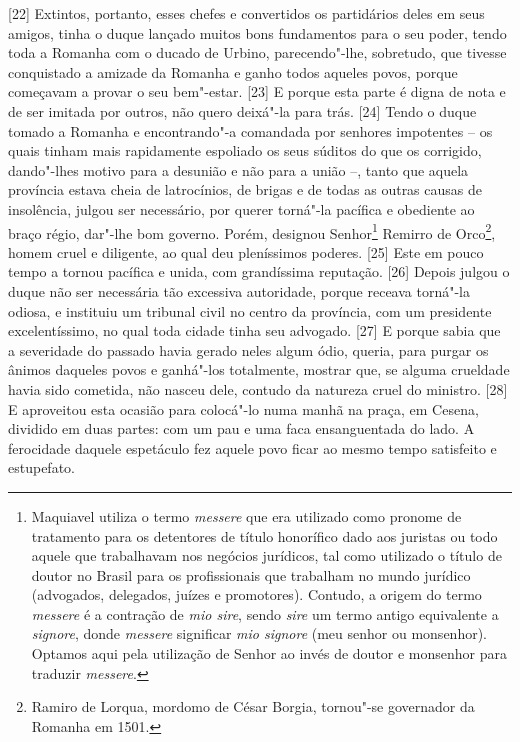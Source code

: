 {[}22{]} Extintos, portanto, esses chefes e convertidos os partidários
deles em seus amigos, tinha o duque lançado muitos bons fundamentos para
o seu poder, tendo toda a Romanha com o ducado de Urbino, parecendo"-lhe,
sobretudo, que tivesse conquistado a amizade da Romanha e ganho todos
aqueles povos, porque começavam a provar o seu bem"-estar. {[}23{]} E
porque esta parte é digna de nota e de ser imitada por outros, não quero
deixá"-la para trás. {[}24{]} Tendo o duque tomado a Romanha e
encontrando"-a comandada por senhores impotentes -- os quais tinham mais
rapidamente espoliado os seus súditos do que os corrigido, dando"-lhes
motivo para a desunião e não para a união --, tanto que aquela província
estava cheia de latrocínios, de brigas e de todas as outras causas de
insolência, julgou ser necessário, por querer torná"-la pacífica e
obediente ao braço régio, dar"-lhe bom governo. Porém, designou
Senhor\footnote{Maquiavel utiliza o termo \emph{messere} que era
  utilizado como pronome de tratamento para os detentores de título
  honorífico dado aos juristas ou todo aquele que trabalhavam nos
  negócios jurídicos, tal como utilizado o título de doutor no Brasil
  para os profissionais que trabalham no mundo jurídico (advogados,
  delegados, juízes e promotores). Contudo, a origem do termo
  \emph{messere} é a contração de \emph{mio sire}, sendo \emph{sire} um
  termo antigo equivalente a \emph{signore}, donde \emph{messere}
  significar \emph{mio signore} (meu senhor ou monsenhor). Optamos aqui
  pela utilização de Senhor ao invés de doutor e monsenhor para traduzir
  \emph{messere}.} Remirro de Orco\footnote{Ramiro de Lorqua, mordomo de
  César Borgia, tornou"-se governador da Romanha em 1501.}, homem cruel e
diligente, ao qual deu pleníssimos poderes. {[}25{]} Este em pouco tempo
a tornou pacífica e unida, com grandíssima reputação. {[}26{]} Depois
julgou o duque não ser necessária tão excessiva autoridade, porque
receava torná"-la odiosa, e instituiu um tribunal civil no centro da
província, com um presidente excelentíssimo, no qual toda cidade tinha
seu advogado. {[}27{]} E porque sabia que a severidade do passado havia
gerado neles algum ódio, queria, para purgar os ânimos daqueles povos e
ganhá"-los totalmente, mostrar que, se alguma crueldade havia sido
cometida, não nasceu dele, contudo da natureza cruel do ministro.
{[}28{]} E aproveitou esta ocasião para colocá"-lo numa manhã na praça,
em Cesena, dividido em duas partes: com um pau e uma faca ensanguentada
do lado. A ferocidade daquele espetáculo fez aquele povo ficar ao mesmo
tempo satisfeito e estupefato.


